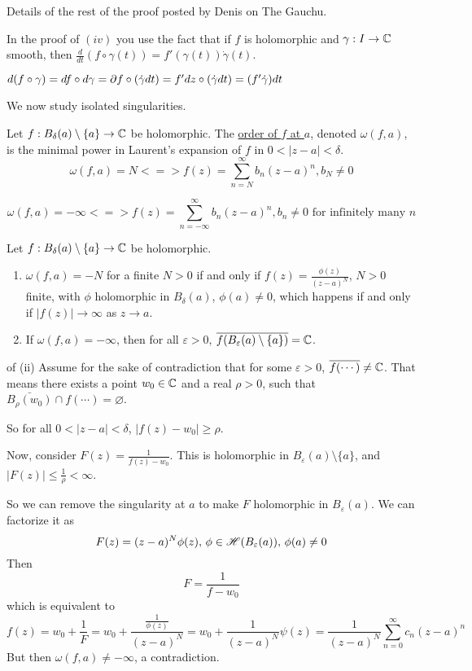 \documentclass[x11names,reqno,14pt]{extarticle}
\newcommand{\oo}{{\infty}}
\begin{document}
Details of the rest of the proof posted by Denis on The Gauchu. 

\rem In the proof of $(iv)$ you use the fact that if $f$ is holomorphic and $\gamma:I\to\mathbb{C}$ smooth, then $\frac{d}{dt}(f \circ \gamma(t)) = f'(\gamma(t))\dot{\gamma}(t)$. 

$d(f\circ \gamma) = df\circ d\gamma = \partial f \circ (\dot{\gamma}dt) = f'dz\circ(\dot{\gamma}dt) = (f'\dot{\gamma})dt$

We now study isolated singularities. 


Let $f:B_{\delta}(a)\setminus\{a\}\to\mathbb{C}$ be holomorphic. The \underline{order of $f$ at $a$}, denoted $\omega(f, a)$, is the minimal power in Laurent's expansion of $f$ in $0 < |z - a| < \delta$. 
\[
\omega(f, a) = N <=> f(z) = \sum_{n=N}^\oo b_n(z - a)^n, b_N\neq0
\]

\[
\omega(f, a) = -\oo <=>f(z) = \sum_{n=-\oo}^\oo b_n(z - a)^n, b_n\neq0\text{ for infinitely many }n
\]

\thm

Let $f:B_{\delta}(a)\setminus\{a\}\to\mathbb{C}$ be holomorphic. 
\begin{enumerate}[label=(\roman*)]
\item $\omega(f, a) = -N$ for a finite $N > 0$ if and only if $f(z) = \frac{\phi(z)}{(z - a)^N}$, $N > 0$ finite, with $\phi$ holomorphic in $B_{\delta}(a)$, $\phi(a)\neq0$, which happens if and only if $|f(z)|\to\oo$ as $z\to a$. 
\item If $\omega(f, a) = -\oo$, then for all $\varepsilon>0$, $\overline{f(B_{\varepsilon}(a)\setminus\{a\})} = \mathbb{C}$.
\end{enumerate}

\proof of (ii)
Assume for the sake of contradiction that for some $\varepsilon>0$, $\overline{f(\cdots)}\neq\mathbb{C}$. That means there exists a point $w_0 \in \mathbb{C}$ and a real $\rho>0$, such that $\bar{B_{\rho}(w_0)}\cap f(\cdots) = \varnothing$. 

So for all $0 < |z - a| < \delta$, $|f(z) - w_0| \geq \rho$. 

Now, consider $F(z) =\frac{1}{f(z) - w_0}$. This is holomorphic in $B_{\varepsilon}(a)\setminus\{a\}$, and $|F(z)| \leq \frac{1}{\rho}<\oo$.

So we can remove the singularity at $a$ to make $F$ holomorphic in $B_{\varepsilon}(a)$. We can factorize it as 
\[
F(z) = (z - a)^N\phi(z),\,\phi\in\mathscr{H}(B_{\varepsilon}(a)),\,\phi(a)\neq0
\]
Then
\[
F = \frac{1}{f - w_0}
\]
which is equivalent to 
\[
f(z) = w_0 + \frac{1}{F} = w_0 + \frac{\frac{1}{\phi(z)}}{(z - a)^N} = w_0 + \frac{1}{(z - a)^N}\psi(z) = \frac{1}{(z - a)^N}\sum_{n=0}^\oo c_n(z - a)^n
\]
But then $\omega(f, a)\neq -\oo$, a contradiction. 
\end{document}
